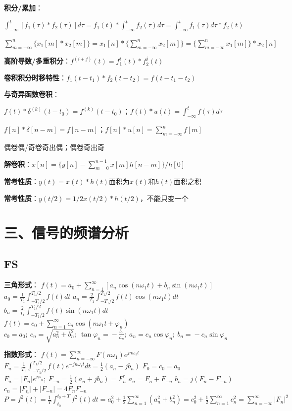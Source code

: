 \textbf{积分/累加}：

$\int^t_{-\infty}[f_1(\tau)*f_2(\tau)]d\tau=f_1(t)*\int^t_{-\infty}f_2(\tau)d\tau=\int^t_{-\infty}f_1(\tau)d\tau*f_2(t)$

 $\sum^n_{m=-\infty}\{x_1[m]*x_2[m]\}=x_1[n]*\{\sum^n_{m=-\infty}x_2[m]\}=\{\sum^n_{m=-\infty}x_1[m]\}*x_2[n]$

\textbf{高阶导数/多重积分}：$f^{(i+j)}(t)=f_1^i(t)*f_2^j(t)$

\textbf{卷积积分时移特性}：$f_1(t-t_1)*f_2(t-t_2)=f(t-t_1-t_2)$

\textbf{与奇异函数卷积}：

$f(t)*\delta^{(k)}(t-t_0)=f^{(k)}(t-t_0)$；$f(t)*u(t)=\int^t_{-\infty}f(\tau)d\tau$

$f[n]*\delta[n-m]=f[n-m]$；$f[n]*u[n]=\sum^n_{m=-\infty}f[m]$

偶卷偶/奇卷奇出偶；偶卷奇出奇

\textbf{解卷积}：$x[n]=\{y[n]-\sum^{n-1}_{m=0}x[m]h[n-m]\}/h[0]$

\textbf{常考性质}：$y(t)=x(t)*h(t)\text{面积为}x(t)\text{和}h(t)\text{面积之积}$

\textbf{常考性质}：$y(t/2)=1/2x(t/2)*h(t/2)$，不能只变一个

\section*{三、信号的频谱分析}

\subsection*{FS}


\textbf{三角形式}：
$f(t)\!=\!a_0\!+\!\sum_{n=1}^{\infty}[a_n\cos(n\omega_1t)\!+\!b_n\sin(n\omega_1t)]$\quad
$a_0\!=\!\frac{1}{T_1}\!\int_{-T_1/2}^{T_1/2}\!\!f(t)dt$\quad
$a_n\!=\!\frac{2}{T_1}\!\int_{-T_1/2}^{T_1/2}\!\!f(t)\cos(n\omega_1t)dt$\quad
$b_n\!=\!\frac{2}{T_1}\!\int_{-T_1/2}^{T_1/2}\!\!f(t)\sin(n\omega_1t)dt$\\
$f(t)\!=\!c_0\!+\!\sum_{n=1}^{\infty}c_n\cos(n\omega_1t\!+\!\varphi_n)$\quad
$c_0\!=\!a_0;\ c_n\!=\!\sqrt{a_n^2\!+\!b_n^2};\ \tan\varphi_n\!=\!-\frac{b_n}{a_n};\ a_n\!=\!c_n\cos\varphi_n;\ b_n\!=\!-c_n\sin\varphi_n$

\textbf{指数形式}：
$f(t)\!=\!\sum_{n=-\infty}^{\infty}\!F(n\omega_1)e^{jn\omega_1t}$\quad
$F_n\!=\!\frac{1}{T_1}\!\int_{-T_1/2}^{T_1/2}\!\!f(t)e^{-jn\omega_1t}dt\!=\!\frac{1}{2}(a_n\!-\!jb_n)$\quad
$F_0=c_0=a_0$\\
$F_n\!=\!|F_n|e^{j\varphi_n};\ F_{-n}\!=\!\frac{1}{2}(a_n\!+\!jb_n)=F_n^*$\quad
$a_n=F_n+F_{-n}$\quad
$b_n=j(F_n-F_{-n})$\quad
$c_n\!=\!|F_n|\!+\!|F_{-n}| = 4F_nF_{-n}$\quad
$P\!=\!\overline{f^2(t)}\!=\!\frac{1}{T}\!\int_{t_0}^{t_0+T}\!\!f^2(t)dt\!=\!a_0^2\!+\!\frac{1}{2}\sum_{n=1}^{\infty}(a_n^2\!+\!b_n^2)\!=\!c_0^2\!+\!\frac{1}{2}\sum_{n=1}^{\infty}c_n^2\!=\!\sum_{n=-\infty}^{\infty}|F_n|^2$

